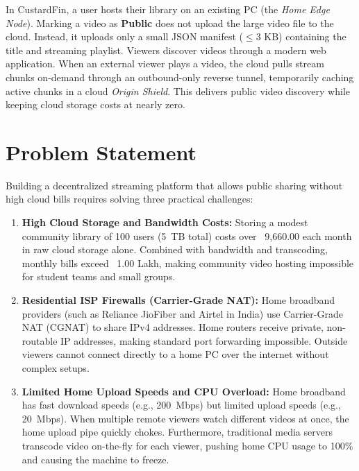In CustardFin, a user hosts their library on an existing PC (the \textit{Home Edge Node}). Marking a video as \textbf{Public} does not upload the large video file to the cloud. Instead, it uploads only a small JSON manifest ($\le 3\text{ KB}$) containing the title and streaming playlist. Viewers discover videos through a modern web application. When an external viewer plays a video, the cloud pulls stream chunks on-demand through an outbound-only reverse tunnel, temporarily caching active chunks in a cloud \textit{Origin Shield}. This delivers public video discovery while keeping cloud storage costs at nearly zero.

\section{Problem Statement}
\label{sec:problem_statement}

Building a decentralized streaming platform that allows public sharing without high cloud bills requires solving three practical challenges:

\begin{enumerate}
    \item \textbf{High Cloud Storage and Bandwidth Costs:} Storing a modest community library of 100 users (5~TB total) costs over \rupee~9,660.00 each month in raw cloud storage alone. Combined with bandwidth and transcoding, monthly bills exceed \rupee~1.00 Lakh, making community video hosting impossible for student teams and small groups.
    
    \item \textbf{Residential ISP Firewalls (Carrier-Grade NAT):} Home broadband providers (such as Reliance JioFiber and Airtel in India) use Carrier-Grade NAT (CGNAT) to share IPv4 addresses. Home routers receive private, non-routable IP addresses, making standard port forwarding impossible. Outside viewers cannot connect directly to a home PC over the internet without complex setups.
    
    \item \textbf{Limited Home Upload Speeds and CPU Overload:} Home broadband has fast download speeds (e.g., 200~Mbps) but limited upload speeds (e.g., 20~Mbps). When multiple remote viewers watch different videos at once, the home upload pipe quickly chokes. Furthermore, traditional media servers transcode video on-the-fly for each viewer, pushing home CPU usage to 100\% and causing the machine to freeze.
\end{enumerate}


